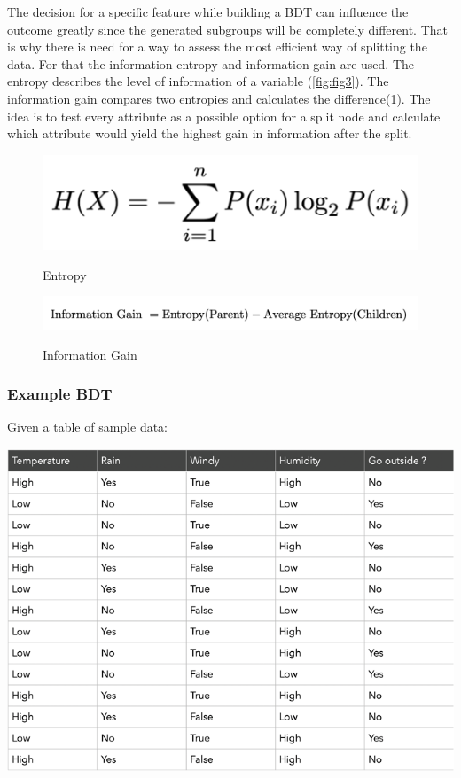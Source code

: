\documentclass[
12pt,
headsepline,
bibliography=totoc,
twoside=semi,
fleqn
]{scrartcl}
\begin{document}
      The decision for a specific feature while building a BDT can influence the outcome greatly since the generated subgroups will be completely different. That is why there is need for a way to assess the most efficient way of splitting the data. For that the information entropy and information gain are used. The entropy describes the level of information of a variable (\ref{fig:fig3}). The information gain compares two entropies and calculates the difference(\ref{fig:fig4}). The idea is to test every attribute as a possible option for a split node and calculate which attribute would yield the highest gain in information after the split. 

      \begin{figure}[h]
        \center\includegraphics[scale=0.55]{BDT3.png}\label{fig:fig3}\caption{Entropy}
        \center\includegraphics[scale=0.55]{BDT4.png}\label{fig:fig4}\caption{Information Gain}
      \end{figure}

    \subsubsection{Example BDT\label{sec:sec2-1-3}}
      Given a table of sample data: \\
      
      \begin{center}\includegraphics[scale=0.7]{BDT5.png}\label{fig:fig5}\end{center}
      
\end{document}
